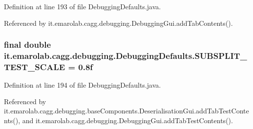 Definition at line 193 of file Debugging\-Defaults.\-java.



Referenced by it.\-emarolab.\-cagg.\-debugging.\-Debugging\-Gui.\-add\-Tab\-Contents().

\hypertarget{classit_1_1emarolab_1_1cagg_1_1debugging_1_1DebuggingDefaults_a8c408f05f2fa4713302830f8a11238e5}{
\subsubsection[{S\-U\-B\-S\-P\-L\-I\-T\-\_\-\-T\-E\-S\-T\-\_\-\-S\-C\-A\-L\-E}]{\setlength{\rightskip}{0pt plus 5cm}final double it.\-emarolab.\-cagg.\-debugging.\-Debugging\-Defaults.\-S\-U\-B\-S\-P\-L\-I\-T\-\_\-\-T\-E\-S\-T\-\_\-\-S\-C\-A\-L\-E = 0.\-8f\hspace{0.3cm}{\ttfamily [static]}}}\label{classit_1_1emarolab_1_1cagg_1_1debugging_1_1DebuggingDefaults_a8c408f05f2fa4713302830f8a11238e5}


Definition at line 194 of file Debugging\-Defaults.\-java.



Referenced by it.\-emarolab.\-cagg.\-debugging.\-base\-Components.\-Deserialisation\-Gui.\-add\-Tab\-Test\-Contents(), and it.\-emarolab.\-cagg.\-debugging.\-Debugging\-Gui.\-add\-Tab\-Test\-Contents().

